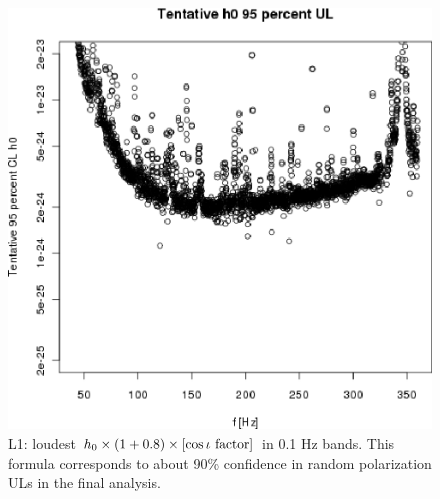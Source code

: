 \begin{figure}
\begin{center}
\includegraphics[width=0.68\paperwidth,height=0.48\paperheight]{plots/h0FullUL95logGuess-L1.eps}
\caption{
L1: loudest $h_0 \times \left( 1 + 0.8 \right) \times \left[\cos \iota \textup{ factor}\right]$ in 0.1 Hz bands. This formula corresponds to about 90\% confidence in random polarization ULs in the final analysis.}
\label{S6_L1_UL}
\end{center}
\end{figure}

